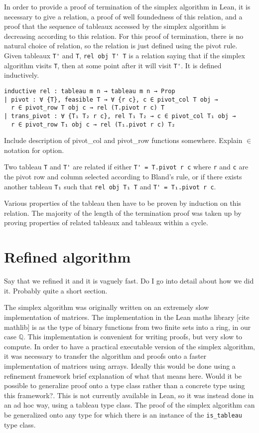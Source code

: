 \documentclass[11pt]{article} %
\begin{document}
In order to provide a proof of termination of the simplex algorithm in Lean, it is necessary to give a relation, a proof of well foundedness of this relation, and a proof that the sequence of tableaux accessed by the simplex algorithm is decreasing according to this relation. For this proof of termination, there is no natural choice of relation, so the relation is just defined using the pivot rule. Given tableaux \lstinline|T'| and \lstinline|T|, \lstinline|rel obj T' T| is a relation saying that if the simplex algorithm visits \lstinline|T|, then at some point after it will visit \lstinline|T'|. It is defined inductively.

\begin{lstlisting}
inductive rel : tableau m n → tableau m n → Prop
| pivot : ∀ {T}, feasible T → ∀ {r c}, c ∈ pivot_col T obj →
  r ∈ pivot_row T obj c → rel (T.pivot r c) T
| trans_pivot : ∀ {T₁ T₂ r c}, rel T₁ T₂ → c ∈ pivot_col T₁ obj →
  r ∈ pivot_row T₁ obj c → rel (T₁.pivot r c) T₂
\end{lstlisting}

\color{red}Include description of pivot\_col and pivot\_row functions somewhere. Explain $\in$ notation for option. \color{black}

Two tableau \lstinline|T| and \lstinline|T'| are related if either \lstinline|T' = T.pivot r c| where \lstinline|r| and \lstinline|c| are the pivot row and column selected according to Bland's rule, or if there exists another tableau \lstinline|T₁| such that \lstinline|rel obj T₁ T| and \lstinline|T' = T₁.pivot r c|.

Various properties of the tableau then have to be proven by induction on this relation. The majority of the length of the termination proof was taken up by proving properties of related tableaux and tableaux within a cycle.

\section{Refined algorithm}
\color{red} Say that we refined it and it is vaguely fast. Do I go into detail about how we did it. Probably quite a short section. \color{black}

The simplex algorithm was originally written on an extremely slow implementation of matrices. The implementation in the Lean maths library \color{red}[cite mathlib]\color{black} is as the type of binary functions from two finite sets into a ring, in our case $\mathbb{Q}$. This implementation is convenient for writing proofs, but very slow to compute. In order to have a practical executable version of the simplex algorithm, it was necessary to transfer the algorithm and proofs onto a faster implementation of matrices using arrays. Ideally this would be done using a refinement framework \color{red} brief explanation of what that means here. Would it be possible to generalize proof onto a type class rather than a concrete type using this framework?\color{black}. This is not currently available in Lean, so it was instead done in an ad hoc way, using a tableau type class. The proof of the simplex algorithm can be generalized onto any type for which there is an instance of the \lstinline|is_tableau| type class.
\end{document}
